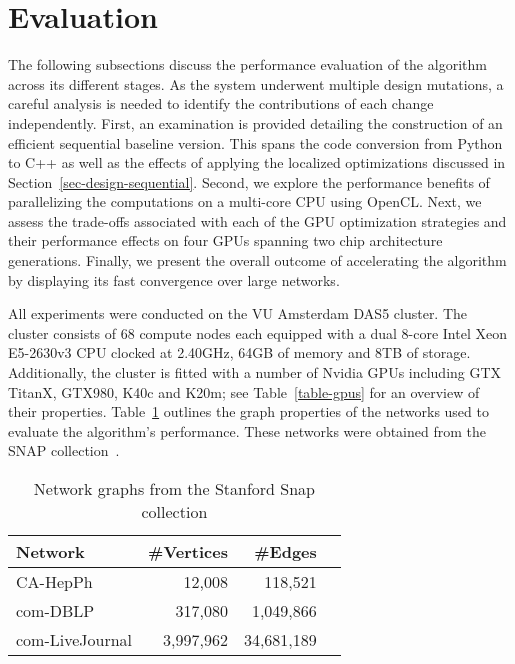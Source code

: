 \section{Evaluation}
\label{sec-evaluation}

The following subsections discuss the performance evaluation of the algorithm
across its different stages. As the system underwent multiple design mutations,
a careful analysis is needed to identify the contributions of each change
independently.
%
First, an examination is provided detailing the construction of an efficient
sequential baseline version.
This spans
the code conversion from Python to C++ as well as the effects of applying
the localized optimizations discussed in
Section~\ref{sec-design-sequential}.
%
Second, we explore the performance benefits of parallelizing the computations
on a multi-core CPU using OpenCL.
%
Next, we assess the trade-offs associated with each of the GPU optimization
strategies and their performance effects on four GPUs spanning two chip
architecture generations.
%
Finally, we present the overall outcome of accelerating the algorithm by
displaying its fast convergence over large networks.

All experiments were conducted on the VU Amsterdam DAS5 cluster. The cluster
consists of 68 compute nodes each equipped with a dual 8-core Intel Xeon
E5-2630v3 CPU clocked at 2.40GHz, 64GB of memory and 8TB of storage.
Additionally, the cluster is fitted with a number of Nvidia GPUs including GTX
TitanX, GTX980, K40c and K20m; see Table~\ref{table-gpus} for an overview of
their properties. Table~\ref{table-snap} outlines the graph
properties of the networks used to evaluate the algorithm's performance. These
networks were obtained from the SNAP collection~\cite{snapnets}.

\begin{table}[tb]
\center\begin{tabular}{l r r c}
Network & \#Vertices & \#Edges \\
\hline
CA-HepPh        &    12,008 &    118,521 \\
com-DBLP        &   317,080 &  1,049,866 \\
com-LiveJournal & 3,997,962 & 34,681,189 \\
\hline
\end{tabular}
\caption{Network graphs from the Stanford Snap collection}
\label{table-snap}
\end{table}





